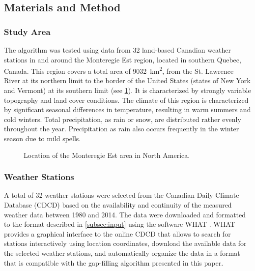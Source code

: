\documentclass[TechnicalNoteMeteo.tex]{subfiles}
\begin{document}
\subsection{Materials and Method}

\subsubsection{Study Area}

The algorithm was tested using data from 32 land-based Canadian weather stations in and around the Monteregie Est region, located in southern Quebec, Canada. This region covers a total area of \SI{9032}{km^2}, from the St. Lawrence River at its northern limit to the border of the United States (states of New York and Vermont) at its southern limit (see \cref{fig:montEst_loc}). It is characterized by strongly variable topography and land cover conditions. The climate of this region is characterized by significant seasonal differences in temperature, resulting in warm summers and cold winters. Total precipitation, as rain or snow, are distributed rather evenly throughout the year. Precipitation as rain also occurs frequently in the winter season due to mild spells.

\begin{figure}[bh!]
    \caption{Location of the Monteregie Est area in North America.}
    \label{fig:montEst_loc}
\end{figure}

\subsubsection{Weather Stations}

A total of 32 weather stations were selected from the Canadian Daily Climate Database (CDCD) based on the availability and continuity of the measured weather data between 1980 and 2014. The data were downloaded and formatted to the format described in \cref{subsec:input} using the software WHAT \citep{gosselin_user_2015}. WHAT provides a graphical interface to the online CDCD that allows to search for stations interactively using location coordinates, download the available data for the selected weather stations, and automatically organize the data in a format that is compatible with the gap-filling algorithm presented in this paper.
\end{document}
